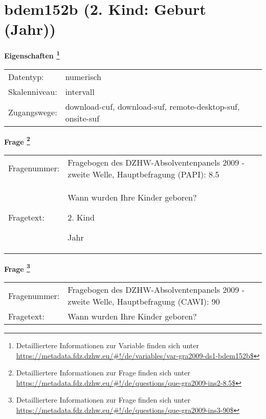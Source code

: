 
    \setcounter{footnote}{0}

    \vspace*{-1.8cm}
	\section{bdem152b (2. Kind: Geburt (Jahr))}
	\label{section:bdem152b}



    \vspace*{0.5cm}
    \noindent\textbf{Eigenschaften
	\footnote{Detailliertere Informationen zur Variable finden sich unter
		\url{https://metadata.fdz.dzhw.eu/\#!/de/variables/var-gra2009-ds1-bdem152b$}}}\\
	\begin{tabularx}{\hsize}{@{}lX}
	Datentyp: & numerisch \\
	Skalenniveau: & intervall \\
	Zugangswege: &
	  download-cuf, 
	  download-suf, 
	  remote-desktop-suf, 
	  onsite-suf
 \\
    \end{tabularx}



				\vspace*{0.5cm}
                \noindent\textbf{Frage
	                \footnote{Detailliertere Informationen zur Frage finden sich unter
		              \url{https://metadata.fdz.dzhw.eu/\#!/de/questions/que-gra2009-ins2-8.5$}}}\\
				\begin{tabularx}{\hsize}{@{}lX}
					Fragenummer: &
					  Fragebogen des DZHW-Absolventenpanels 2009 - zweite Welle, Hauptbefragung (PAPI):
					  8.5
 \\
					Fragetext: & Wann wurden Ihre Kinder geboren?\par  2. Kind\par  Jahr \\
				\end{tabularx}
				\vspace*{0.5cm}
                \noindent\textbf{Frage
	                \footnote{Detailliertere Informationen zur Frage finden sich unter
		              \url{https://metadata.fdz.dzhw.eu/\#!/de/questions/que-gra2009-ins3-90$}}}\\
				\begin{tabularx}{\hsize}{@{}lX}
					Fragenummer: &
					  Fragebogen des DZHW-Absolventenpanels 2009 - zweite Welle, Hauptbefragung (CAWI):
					  90
 \\
					Fragetext: & Wann wurden Ihre Kinder geboren? \\
				\end{tabularx}






